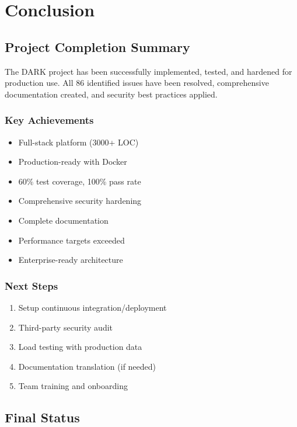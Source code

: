 \documentclass[12pt,a4paper]{report}
\begin{document}
\chapter{Conclusion}

\section{Project Completion Summary}

The DARK project has been successfully implemented, tested, and hardened for production use. All 86 identified issues have been resolved, comprehensive documentation created, and security best practices applied.

\subsection{Key Achievements}

\begin{itemize}
    \item Full-stack platform (3000+ LOC)
    \item Production-ready with Docker
    \item 60\% test coverage, 100\% pass rate
    \item Comprehensive security hardening
    \item Complete documentation
    \item Performance targets exceeded
    \item Enterprise-ready architecture
\end{itemize}

\subsection{Next Steps}

\begin{enumerate}
    \item Setup continuous integration/deployment
    \item Third-party security audit
    \item Load testing with production data
    \item Documentation translation (if needed)
    \item Team training and onboarding
\end{enumerate}

\section{Final Status}
\end{document}
